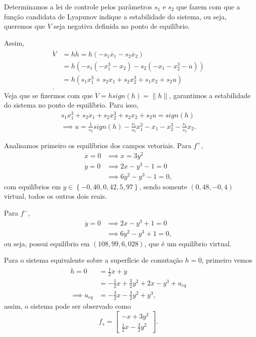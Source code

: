 \documentclass[a4paper]{report}
\begin{document}
Determinamos a lei de controle pelos parâmetros $s_1$ e $s_2$ que fazem com que a função candidata de Lyapunov indique a estabilidade do sistema, ou seja, queremos que $\dot{V}$ seja negativa definida no ponto de equilíbrio.

Assim,
\begin{align*}
    \dot{V} &= h \dot{h} = h \left( -s_1\dot{x_1} -s_2\dot{x_2} \right) \\
	    &= h \left( -s_1\left( -x_1^3 -x_2 \right) -s_2\left( -x_1 -x_2^3 -u  \right)   \right) \\
	    &= h \left( s_1 x_1^{3} +s_2x_1 +s_2x_2^{3} +s_1x_2+s_2u  \right)  \\
.\end{align*}
Veja que se fizermos com que $\dot{V} = h sign(h) = \|h\|$, garantimos a estabilidade do sistema no ponto de equilíbrio. Para isso,
\begin{align*}
    s_1 x_1^{3} +s_2x_1 +s_2x_2^{3} +s_2x_2 +s_2u  = sign(h) \\
    \implies u = \frac{1}{s_2}sign(h) - \frac{s_1}{s_2} x_1^{3} -x_1 -x_2^{3} -\frac{s_1}{s_2}x_2
.\end{align*}



Analisamos primeiro os equilíbrios dos campos vetoriais. Para $f^{+}$,
\begin{align*}
    \dot{x} = 0 &\implies x = 3y^2 \\
    \dot{y} = 0 &\implies 2x - y^3 -1 = 0 \\
		&\implies 6y^2 - y^3 - 1 = 0
,\end{align*}
com equilíbrios em $y \in  \left\{ -0,40, 0,42, 5,97 \right\}$, sendo somente $(0,48, -0,4)$ virtual, todos os outros dois reais.

Para $f^{-}$,
\begin{align*}
    \dot{y} = 0 &\implies 2x - y^3 +1 = 0 \\
		&\implies 6y^2 - y^3 + 1 = 0
,\end{align*}
ou seja, possui equilíbrio em $(108,99, 6,028)$, que é um equilíbrio virtual.

Para o sistema equivalente sobre a superfície de comutação  $h=0$, primeiro vemos
\begin{align*}
    \dot{h} =0&= \frac{1}{2}\dot{x} + \dot{y} \\
	      &= -\frac{1}{2}x + \frac{3}{2}y^2 +2x -y^3 + u_{eq} \\
    \implies u_{eq} &= -\frac{3}{2}x -\frac{3}{2}y^2 + y^3
,\end{align*}
assim, o sistema pode ser observado como \[
f_s = \begin{bmatrix} -x +3y^2 \\ \frac{1}{2}x -\frac{3}{2}y^2 \end{bmatrix} 
.\] 
\end{document}
